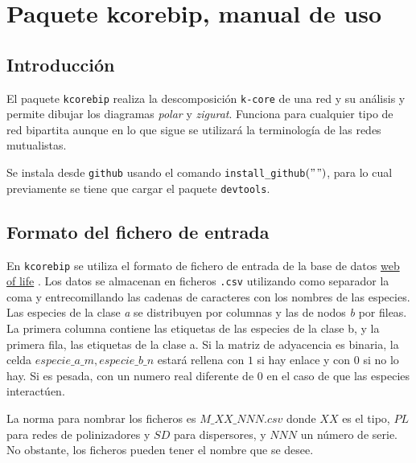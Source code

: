 
\appendix
\renewcommand{\thechapter}{B}
\chapter{Paquete kcorebip, manual de uso} %

\label{APP_KCOREMANBIP} %

\section{Introducción}

El paquete \texttt{kcorebip} realiza la descomposición \texttt{k-core} de una red y su análisis y permite dibujar los diagramas \textit{polar}
y \textit{zigurat}. Funciona para cualquier tipo de red bipartita aunque en lo que sigue se utilizará la terminología de las redes mutualistas.

Se instala desde \texttt{github} usando el comando \texttt{install\_github}$("$$")$, para lo cual previamente se tiene que cargar el paquete \texttt{devtools}.
 
\section{Formato del fichero de entrada}
\label{input_file_format}

En \texttt{kcorebip} se utiliza el formato de fichero de entrada de la base de datos \href{http://www.web-of-life.es/}{web of life} \cite{bascompte2009}. Los datos se almacenan en ficheros \texttt{.csv} utilizando como separador la coma y entrecomillando las cadenas de caracteres con los nombres de las especies. Las especies de la clase \textit{a} se distribuyen por columnas y las de nodos \textit{b} por fileas. La primera columna contiene las etiquetas de las especies de la clase b, y la primera fila, las etiquetas de la clase a. Si la matriz de adyacencia es binaria, la celda $especie\_a\_m,especie\_b\_n$ estará rellena con $1$ si hay enlace y con $0$ si no lo hay. Si es pesada, con un numero real diferente de $0$ en el caso de que las especies interactúen.

La norma para nombrar los ficheros es $M\_XX\_NNN.csv$ donde $XX$ es el tipo, $PL$ para redes de polinizadores y $SD$ para dispersores, y $NNN$ un número de serie. No obstante, los ficheros pueden tener el nombre que se desee.

